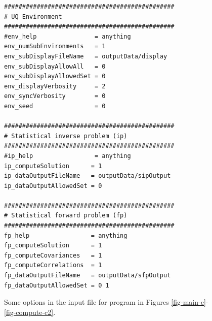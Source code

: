 \begin{figure}[h!]
\begin{center}
\begin{verbatim}
###############################################
# UQ Environment
###############################################
#env_help                = anything
env_numSubEnvironments   = 1
env_subDisplayFileName   = outputData/display
env_subDisplayAllowAll   = 0
env_subDisplayAllowedSet = 0
env_displayVerbosity     = 2
env_syncVerbosity        = 0
env_seed                 = 0

###############################################
# Statistical inverse problem (ip)
###############################################
#ip_help                 = anything
ip_computeSolution      = 1
ip_dataOutputFileName   = outputData/sipOutput
ip_dataOutputAllowedSet = 0

###############################################
# Statistical forward problem (fp)
###############################################
fp_help                 = anything
fp_computeSolution      = 1
fp_computeCovariances   = 1
fp_computeCorrelations  = 1
fp_dataOutputFileName   = outputData/sfpOutput
fp_dataOutputAllowedSet = 0 1
\end{verbatim}
\end{center}
\caption{
Some options in the input file for program in Figures \ref{fig-main-c}-\ref{fig-compute-c2}.
}
\label{fig-options-input-1}
\end{figure}

